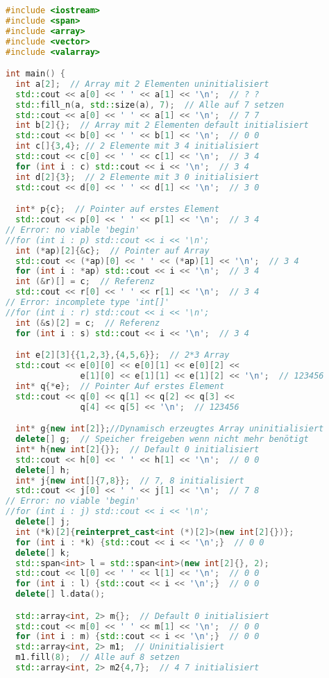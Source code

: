 \documentclass[10pt,twocolumn]{scrartcl}
\begin{document}
\begin{lstlisting}[language=C++]
#include <iostream>
#include <span>
#include <array>
#include <vector>
#include <valarray>

int main() {
  int a[2];  // Array mit 2 Elementen uninitialisiert
  std::cout << a[0] << ' ' << a[1] << '\n';  // ? ?
  std::fill_n(a, std::size(a), 7);  // Alle auf 7 setzen
  std::cout << a[0] << ' ' << a[1] << '\n';  // 7 7
  int b[2]{};  // Array mit 2 Elementen default initialisiert
  std::cout << b[0] << ' ' << b[1] << '\n';  // 0 0
  int c[]{3,4}; // 2 Elemente mit 3 4 initialisiert
  std::cout << c[0] << ' ' << c[1] << '\n';  // 3 4
  for (int i : c) std::cout << i << '\n';  // 3 4
  int d[2]{3};  // 2 Elemente mit 3 0 initialisiert
  std::cout << d[0] << ' ' << d[1] << '\n';  // 3 0

  int* p{c};  // Pointer auf erstes Element
  std::cout << p[0] << ' ' << p[1] << '\n';  // 3 4
// Error: no viable 'begin'
//for (int i : p) std::cout << i << '\n';
  int (*ap)[2]{&c};  // Pointer auf Array
  std::cout << (*ap)[0] << ' ' << (*ap)[1] << '\n';  // 3 4
  for (int i : *ap) std::cout << i << '\n';  // 3 4
  int (&r)[] = c;  // Referenz
  std::cout << r[0] << ' ' << r[1] << '\n';  // 3 4
// Error: incomplete type 'int[]'
//for (int i : r) std::cout << i << '\n';
  int (&s)[2] = c;  // Referenz
  for (int i : s) std::cout << i << '\n';  // 3 4

  int e[2][3]{{1,2,3},{4,5,6}};  // 2*3 Array
  std::cout << e[0][0] << e[0][1] << e[0][2] <<
               e[1][0] << e[1][1] << e[1][2] << '\n';  // 123456
  int* q{*e};  // Pointer Auf erstes Element
  std::cout << q[0] << q[1] << q[2] << q[3] <<
               q[4] << q[5] << '\n';  // 123456

  int* g{new int[2]};//Dynamisch erzeugtes Array uninitialisiert
  delete[] g;  // Speicher freigeben wenn nicht mehr benötigt
  int* h{new int[2]{}};  // Default 0 initialisiert
  std::cout << h[0] << ' ' << h[1] << '\n';  // 0 0
  delete[] h;
  int* j{new int[]{7,8}};  // 7, 8 initialisiert
  std::cout << j[0] << ' ' << j[1] << '\n';  // 7 8
// Error: no viable 'begin'
//for (int i : j) std::cout << i << '\n';
  delete[] j;
  int (*k)[2]{reinterpret_cast<int (*)[2]>(new int[2]{})};
  for (int i : *k) {std::cout << i << '\n';}  // 0 0
  delete[] k;
  std::span<int> l = std::span<int>(new int[2]{}, 2);
  std::cout << l[0] << ' ' << l[1] << '\n';  // 0 0
  for (int i : l) {std::cout << i << '\n';}  // 0 0
  delete[] l.data();

  std::array<int, 2> m{};  // Default 0 initialisiert
  std::cout << m[0] << ' ' << m[1] << '\n';  // 0 0
  for (int i : m) {std::cout << i << '\n';}  // 0 0
  std::array<int, 2> m1;  // Uninitialisiert
  m1.fill(8);  // Alle auf 8 setzen
  std::array<int, 2> m2{4,7};  // 4 7 initialisiert


\end{lstlisting}
\end{document}

